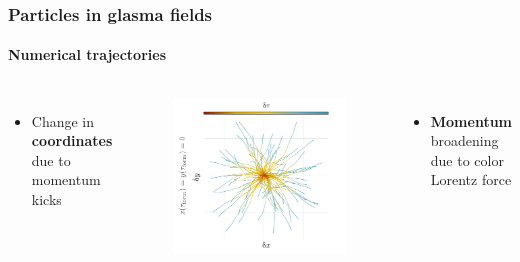 \documentclass[aspectratio=169,11pt,usenames,dvipsnames]{beamer}
\begin{document}
\begin{frame}
    \frametitle{Particles in glasma fields}
    \framesubtitle{Numerical trajectories}
    \vspace{-0.5cm}
    \begin{columns}[onlytextwidth,t]
            \begin{itemize}\itemsep0em 
                \item \begin{center}\footnotesize Change in {\bfseries coordinates} due to momentum kicks\end{center}
            \end{itemize}
                \vspace{-20pt}
                \begin{figure}[!hbt]
                    \centering
                \includegraphics[width=1.1\columnwidth]{images/wong_coord.png}
                \end{figure}
            \begin{itemize}\itemsep0em 
                \item \begin{center}\footnotesize {\bfseries Momentum} broadening due to color Lorentz force\end{center}

\end{itemize}
\end{columns}
\end{frame}
\end{document}
